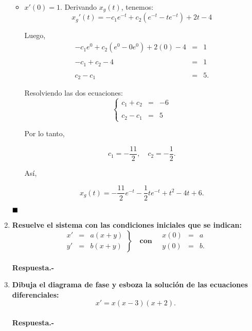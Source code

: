 \begin{enumerate}
\begin{multicols}{2}
\begin{itemize}
	    \item $x'(0)=1$.
		Derivando $x_g(t)$, tenemos:
		$$x_g'(t)=-c_1e^{-t}+c_2\left(e^{-t}-te^{-t}\right)+2t-4$$

		Luego, 
		$$
		\begin{array}{rcl}
		    -c_1e^{0}+c_2\left(e^{0}-0e^{0}\right)+2(0)-4&=&1\\\\
		    -c_1+c_2-4&=&1\\\\
		    c_2-c_1&=&5.
		\end{array}
		$$

		Resolviendo las dos ecuaciones:
		$$
		\left\{
		    \begin{array}{rcr}
			c_1+c_2&=&-6\\\\
			c_2-c_1&=&5
		    \end{array}
		\right. 
		$$
		
		Por lo tanto,

		\begin{tcolorbox}
		    $$c_1=-\dfrac{11}{2},\quad c_2=-\dfrac{1}{2}.$$
		\end{tcolorbox}
		Así, 

		\begin{tcolorbox}
		    $$x_g(t)=-\dfrac{11}{2}e^{-t}-\dfrac{1}{2}te^{-t}+ t^2-4t+6.$$
		\end{tcolorbox}

	\end{itemize}
	$\hfill\blacksquare$
	\vspace{.5cm}
    \end{multicols}


    \item \textbf{\boldmath Resuelve el sistema con las condiciones iniciales que se indican:
    $$
    \left.
	\begin{array}{rcl}
	    x'&=&a(x+y)\\
	    y'&=&b(x+y)
	\end{array}
    \right\} \quad\textbf{con}\quad
    \begin{array}{rcl}
	x(0)&=&a\\
	y(0)&=&b.
    \end{array}
    $$
    \vspace{0.4cm}\\
	Respuesta.-}\; 

    \item \textbf{\boldmath Dibuja el diagrama de fase y esboza la solución de las ecuaciones diferenciales:
    $$x'=x(x-3)(x+2).$$\\
	Respuesta.-}\; 

\end{enumerate}
